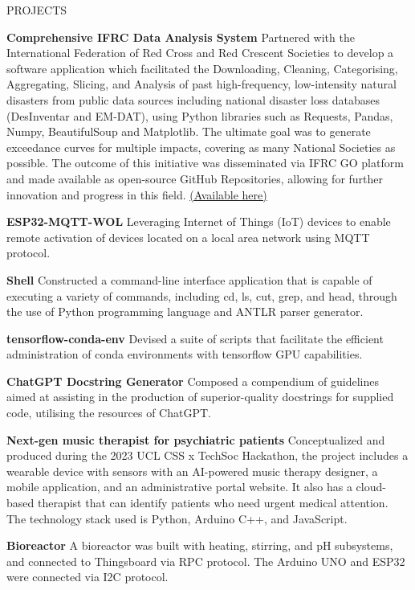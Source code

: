 \documentclass{resume} %
\begin{document}
\begin{rSection}{PROJECTS}
\vspace{-1.25em}
\item \textbf{Comprehensive IFRC Data Analysis System} {Partnered with the International Federation of Red Cross and Red Crescent Societies to develop a software application which facilitated the Downloading, Cleaning, Categorising, Aggregating, Slicing, and Analysis of past high-frequency, low-intensity natural disasters from public data sources including national disaster loss databases (DesInventar and EM-DAT), using Python libraries such as Requests, Pandas, Numpy, BeautifulSoup and Matplotlib. The ultimate goal was to generate exceedance curves for multiple impacts, covering as many National Societies as possible. The outcome of this initiative was disseminated via IFRC GO platform and made available as open-source GitHub Repositories, allowing for further innovation and progress in this field. \href{https://students.cs.ucl.ac.uk/2022/group5/index.html}{(Available here)}}
\item \textbf{ESP32-MQTT-WOL} {Leveraging Internet of Things (IoT) devices to enable remote activation of devices located on a local area network using MQTT protocol.}
\item \textbf{Shell} {Constructed a command-line interface application that is capable of executing a variety of commands, including cd, ls, cut, grep, and head, through the use of Python programming language and ANTLR parser generator.}
\item \textbf{tensorflow-conda-env} {Devised a suite of scripts that facilitate the efficient administration of conda environments with tensorflow GPU capabilities.}
\item \textbf{ChatGPT Docstring Generator} {Composed a compendium of guidelines aimed at assisting in the production of superior-quality docstrings for supplied code, utilising the resources of ChatGPT.}
\item \textbf{Next-gen music therapist for psychiatric patients} {Conceptualized and produced during the 2023 UCL CSS x TechSoc Hackathon, the project includes a wearable device with sensors with an AI-powered music therapy designer, a mobile application, and an administrative portal website. It also has a cloud-based therapist that can identify patients who need urgent medical attention. The technology stack used is Python, Arduino C++, and JavaScript.}
\item \textbf{Bioreactor} {A bioreactor was built with heating, stirring, and pH subsystems, and connected to Thingsboard via RPC protocol. The Arduino UNO and ESP32 were connected via I2C protocol.}
\end{rSection} 
\end{document}
